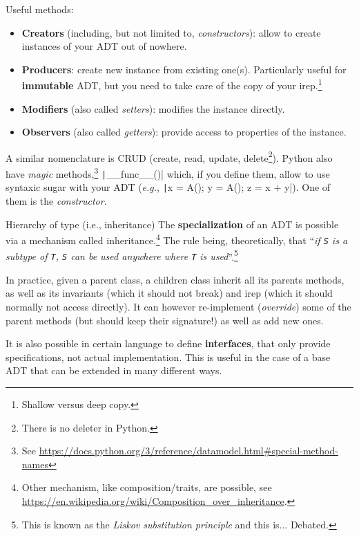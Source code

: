\documentclass[10pt,
aspectratio=169
]{beamer}
\begin{document}
\begin{frame}
	Useful methods:\begin{itemize}
		\item \textbf{Creators} (including, but not limited to, \textit{constructors}): allow to create instances of your ADT out of nowhere.
		\item \textbf{Producers}: create new instance from existing one(s). Particularly useful for \textbf{immutable} ADT, but you need to take care of the copy of your irep.\footnote{Shallow versus deep copy.}
		\item \textbf{Modifiers} (also called \textit{setters}): modifies the instance directly.
		\item \textbf{Observers} (also called \textit{getters}): provide access to properties of the instance.
	\end{itemize}
	A similar nomenclature is CRUD (create, read, update, delete\footnote{There is no deleter in Python.}). Python also have \textit{magic} methods,\footnote{See \url{https://docs.python.org/3/reference/datamodel.html\#special-method-names}} \texttt|__func__()| which, if you define them, allow to use syntaxic sugar with your ADT (\textit{e.g.}, \texttt|x = A(); y = A(); z = x + y|). One of them is the \textit{constructor}.
\end{frame}

\begin{frame}{Hierarchy of type (i.e., inheritance)}
	The \textbf{specialization} of an ADT is possible via a mechanism called inheritance.\footnote{Other mechanism, like composition/traits, are possible, see \url{https://en.wikipedia.org/wiki/Composition_over_inheritance}.} The rule being, theoretically, that ``\emph{if \texttt{S} is a subtype of \texttt{T}, \texttt{S} can be used anywhere where \texttt{T} is used}''.\footnote{This is known as the \textit{Liskov substitution principle} and this is... Debated.}
	
	In practice, given a parent class,  a children class inherit all its parents methods, as well as its invariants (which it should not break) and irep (which it should normally not access directly). It can however re-implement (\textit{override}) some of the parent methods (but should keep their signature!) as well as add new ones.
	
	It is also possible in certain language to define \textbf{interfaces}, that only provide specifications, not actual implementation. This is useful in the case of a base ADT that can be extended in many different ways.
\end{frame}
\end{document}
